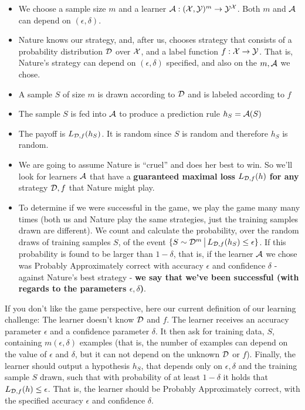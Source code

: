   \begin{itemize}
    \item We choose a sample size $m$ and a learner $\mathcal{A}:(\mathcal{X},\mathcal{Y})^m \to \mathcal{Y}^{\mathcal{X}}$. 
    Both $m$ and $\mathcal{A}$ can depend on $(\epsilon,\delta)$.
       \item Nature knows our strategy, and, after us, chooses strategy that consists of a probability distribution $\mathcal{D}$ over $\mathcal{X}$, and a label function $f:\mathcal{X}\to\mathcal{Y}$. 
       That is, Nature's strategy can depend on $(\epsilon,\delta)$ specified, and also on the $m,\mathcal{A}$ we chose. 
    \item A sample $S$ of size $m$ is drawn according to $\mathcal{D}$ and is labeled
      according to $f$
    \item The sample $S$ is fed into $\mathcal{A}$ to produce a prediction rule
      $h_S=\mathcal{A}(S)$
    \item The payoff is $L_{\mathcal{D},f}(h_S)$. It is random since $S$ is random and
      therefore $h_S$ is random.
    \item We are going to assume Nature is ``cruel'' and does her best to win.
      So we'll look for learners $\mathcal{A}$ that have a {\bf guaranteed maximal 
      loss} $L_{\mathcal{D},f}(h)$ {\bf for any} strategy $\mathcal{D},f$ that Nature might play.
      \item To determine if we were successful in the game, we play the game many many times 
      (both us and Nature play the same strategies, just the training samples drawn are different).
      We count and calculate the probability, over the random draws of training samples $S$, of the event
      $\{ S \sim \mathcal{D}^m \,\big |\,L_{\mathcal{D},f}(h_S)\leq \epsilon \}$. If this probability is found to be 
      larger than $1-\delta$, that is, if 
      the learner $\mathcal{A}$ we chose was Probably Approximately correct with accuracy $\epsilon$ and confidence $\delta$ - against Nature's best strategy - {\bf we say that we've been successful (with regards to the parameters $\epsilon,\delta$)}.
\end{itemize}


If you don't like the game perspective, here our current definition of our learning challenge:
The learner doesn't know $\mathcal{D}$ and $f$. The learner receives an accuracy parameter $\epsilon$ and a confidence parameter $\delta$. It then ask for training data, $S$, containing $m(\epsilon,\delta)$ examples (that is, the number of examples can depend on the value of $\epsilon$ and $\delta$, but it can not depend on the unknown $\mathcal{D}$ or $f$). Finally, the learner should output a hypothesis $h_S$, that depends only on $\epsilon, \delta$ and the training sample $S$ drawn, such that with probability of at least $1-\delta$  it holds that $L_{\mathcal{D},f}(h) \le \epsilon$. That is, the learner should be Probably Approximately correct, with the specified accuracy $\epsilon$ and confidence $\delta$.

